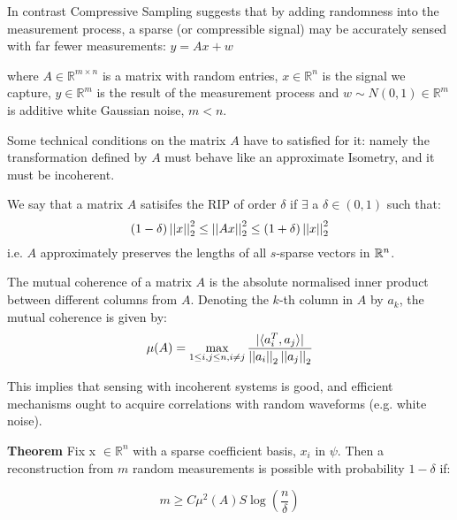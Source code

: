In contrast Compressive Sampling suggests that by adding randomness into the measurement process, a sparse (or compressible signal) may be accurately sensed with far fewer measurements:
$y = Ax + w$

where \(A \in \mathbb{R}^{m \times n}\) is a matrix with random entries, \(x \in \mathbb{R}^n\) is the signal we capture, \(y \in \mathbb{R}^m\) is the result of the measurement process and \(w \sim N\left(0,1\right) \in \mathbb{R}^m\) is additive white Gaussian noise, \(m < n\).

Some technical conditions on the matrix \(A\) have to satisfied for it: namely the transformation defined by \(A\) must behave like an approximate Isometry, and it must be incoherent.

\begin{definition}[RIP]
We say that a matrix \(A\) satisifes the RIP of order \(\delta\) if \(\exists\) a \(\delta \in \left(0, 1\right)\) such that:
\begin{equation}
\left(1 - \delta\right) \left|\left|x\right|\right|_2^2 \leq \left|\left|Ax\right|\right|_2^2 \leq \left(1 + \delta\right) \left|\left|x\right|\right|_2^2
\end{equation}
i.e. \(A\) approximately preserves the lengths of all \(s\)-sparse vectors in \({\mathbb{R}}^n\). 
\end{definition}

\begin{definition}[Coherence]
The mutual coherence of a matrix \(A\) is the absolute normalised inner product between different columns from \(A\). Denoting the \(k\)-th column in \(A\) by \(a_k\), the mutual coherence is given by:
\begin{equation}
\mu(A) = \max_{1\leq i,j\leq n , i\neq j} \frac{|\langle a^T_i, a_j\rangle|}{\left|\left|a_i\right|\right|_2\left|\left|a_j\right|\right|_2}
\end{equation}
\end{definition}

This implies that sensing with incoherent systems is good, and efficient mechanisms ought to acquire correlations with random waveforms (e.g. white noise).

\textbf{Theorem} \cite{Candes2006}
Fix x \(\in \mathbb{R}^n\) with a sparse coefficient basis, \(x_{i}\) in \(\psi\). Then a reconstruction from \(m\) random measurements is possible with probability \(1 - \delta\) if: 

\begin{equation}
m \geq C \mu^2(A) S \log\left(\frac{n}{\delta}\right)
\end{equation}
\label{minsamples}

